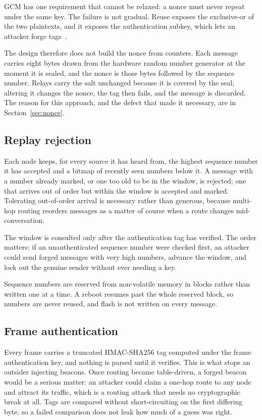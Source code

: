 \documentclass[12pt,a4paper,oneside]{report}
\begin{document}
GCM has one requirement that cannot be relaxed: a nonce must never repeat under
the same key. The failure is not gradual. Reuse exposes the exclusive-or of the
two plaintexts, and it exposes the authentication subkey, which lets an attacker
forge tags~\cite{dworkin2007gcm}.

The design therefore does not build the nonce from counters. Each message carries
eight bytes drawn from the hardware random number generator at the moment it is
sealed, and the nonce is those bytes followed by the sequence number. Relays
carry the salt unchanged because it is covered by the seal; altering it changes
the nonce, the tag then fails, and the message is discarded. The reason for this
approach, and the defect that made it necessary, are in Section~\ref{sec:nonce}.

\subsection{Replay rejection}

Each node keeps, for every source it has heard from, the highest sequence number
it has accepted and a bitmap of recently seen numbers below it. A message with a
number already marked, or one too old to be in the window, is rejected; one that
arrives out of order but within the window is accepted and marked. Tolerating
out-of-order arrival is necessary rather than generous, because multi-hop routing
reorders messages as a matter of course when a route changes mid-conversation.

The window is consulted only after the authentication tag has verified. The order
matters: if an unauthenticated sequence number were checked first, an attacker
could send forged messages with very high numbers, advance the window, and lock
out the genuine sender without ever needing a key.

Sequence numbers are reserved from non-volatile memory in blocks rather than
written one at a time. A reboot resumes past the whole reserved block, so numbers
are never reused, and flash is not written on every message.

\subsection{Frame authentication}

Every frame carries a truncated HMAC-SHA256 tag computed under the frame
authentication key, and nothing is parsed until it verifies. This is what stops
an outsider injecting beacons. Once routing became table-driven, a forged beacon
would be a serious matter: an attacker could claim a one-hop route to any node
and attract its traffic, which is a routing attack that needs no cryptographic
break at all. Tags are compared without short-circuiting on the first differing
byte, so a failed comparison does not leak how much of a guess was right.
\end{document}
